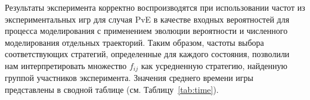 Результаты эксперимента корректно воспроизводятся при использовании частот из экспериментальных игр для случая PvE в качестве входных вероятностей для процесса моделирования с применением эволюции вероятности и численного моделирования отдельных траекторий. Таким образом, частоты выбора соответствующих стратегий, определенные для каждого состояния, позволили нам интерпретировать множество $f_{ij}$ как усредненную стратегию, найденную группой участников эксперимента. Значения среднего времени игры представлены в сводной таблице (см. Таблицу~\cref{tab:time}).

\begin{table}
    \fontsize{10pt}{10pt}\selectfont
    \begin{tabular}{|l|c|c|c|c|c|}%
        

\end{tabular}
\end{table}
